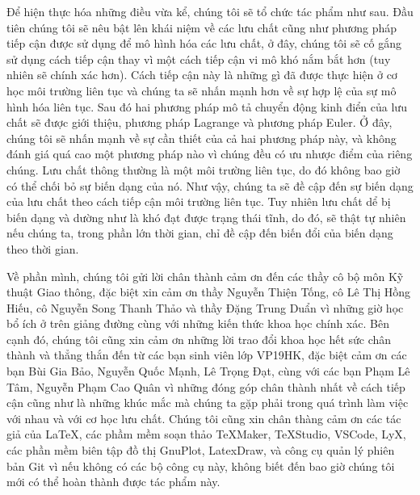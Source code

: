 \documentclass[main.tex]{subfiles}
\begin{document}
Để hiện thực hóa những điều vừa kể, chúng tôi sẽ tổ chức tác phẩm như sau. Đầu tiên chúng tôi sẽ nêu bật lên khái niệm về các lưu chất cũng như phương pháp tiếp cận được sử dụng để mô hình hóa các lưu chất, ở đây, chúng tôi sẽ cố gắng sử dụng cách tiếp cận  thay vì một cách tiếp cận vi mô khó nắm bắt hơn (tuy nhiên sẽ chính xác hơn). Cách tiếp cận này là những gì đã được thực hiện ở cơ học môi trường liên tục và chúng ta sẽ nhấn mạnh hơn về sự hợp lệ của sự mô hình hóa liên tục. Sau đó hai phương pháp mô tả chuyển động kinh điển của lưu chất sẽ được giới thiệu, phương pháp Lagrange và phương pháp Euler. Ở đây, chúng tôi sẽ nhấn mạnh về sự cần thiết của cả hai phương pháp này, và không đánh giá quá cao một phương pháp nào vì chúng đều có ưu nhược điểm của riêng chúng. Lưu chất thông thường là một môi trường liên tục, do đó không bao giờ có thể chối bỏ sự biến dạng của nó. Như vậy, chúng ta sẽ đề cập đến sự biến dạng của lưu chất theo cách tiếp cận môi trường liên tục. Tuy nhiên lưu chất dể bị biến dạng và dường như là khó đạt được trạng thái tĩnh, do đó, sẽ thật tự nhiên nếu chúng ta, trong phần lớn thời gian, chỉ đề cập đến biến đổi của biến dạng theo thời gian.

Về phần mình, chúng tôi gửi lời chân thành cảm ơn đến các thầy cô bộ môn Kỹ thuật Giao thông, đặc biệt xin cảm ơn thầy Nguyễn Thiện Tống, cô Lê Thị Hồng Hiếu, cô Nguyễn Song Thanh Thảo và thầy Đặng Trung Duẩn vì những giờ học bổ ích ở trên giảng đường cùng với những kiến thức khoa học chính xác. Bên cạnh đó, chúng tôi cũng xin cảm ơn những lời trao đổi khoa học hết sức chân thành và thẳng thắn đến từ các bạn sinh viên lớp VP19HK, đặc biệt cảm ơn các bạn Bùi Gia Bảo, Nguyễn Quốc Mạnh, Lê Trọng Đạt, cùng với các bạn Phạm Lê Tâm, Nguyễn Phạm Cao Quân vì những đóng góp chân thành nhất về cách tiếp cận cũng như là những khúc mắc mà chúng ta gặp phải trong quá trình làm việc với nhau và với cơ học lưu chất. Chúng tôi cũng xin chân thàng cảm ơn các tác giả của \LaTeX, các phầm mềm soạn thảo TeXMaker, TeXStudio, VSCode, LyX, các phần mềm biên tập đồ thị GnuPlot, LatexDraw, và công cụ quản lý phiên bản Git vì nếu không có các bộ công cụ này, không biết đến bao giờ chúng tôi mới có thể hoàn thành được tác phẩm này.
\end{document}
